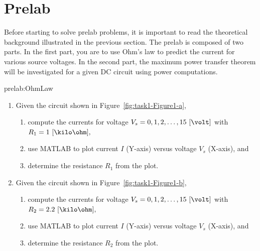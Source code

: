 \section{Prelab}
\label{sec:prelab}
Before starting to solve prelab problems, it is important to read the theoretical background illustrated in the previous section. The prelab is composed of two parts. In the first part, you are to use Ohm's law to predict the current for various source voltages. In the second part, the maximum power transfer theorem will be investigated for a given DC circuit using power computations. %
%
\begin{prelab}{prelab:OhmLaw}

\begin{enumerate}
    \item Given the circuit shown in Figure~\ref{fig:task1-Figure1-a}, 
     \begin{enumerate}
         \item compute the currents for voltage $V_s=0,1,2,\ldots,15~[\volt]$ with $R_1=1~[\kilo\ohm],$
         \item use MATLAB to plot current $I$ (Y-axis) versus voltage $V_s$ (X-axis), and
           
         \item determine the resistance $R_1$ from the plot. 
         \end{enumerate}

    \item Given the circuit shown in Figure~\ref{fig:task1-Figure1-b}, 
     \begin{enumerate}
         \item compute the currents for voltage $V_s=0,1,2,\ldots,15~[\volt]$ with $R_2=2.2~[\kilo\ohm],$
         \item use MATLAB to plot current $I$ (Y-axis) versus voltage $V_s$ (X-axis), and
           
         \item determine the resistance $R_2$ from the plot. 
         \end{enumerate}
\end{enumerate}
 
\end{prelab}


